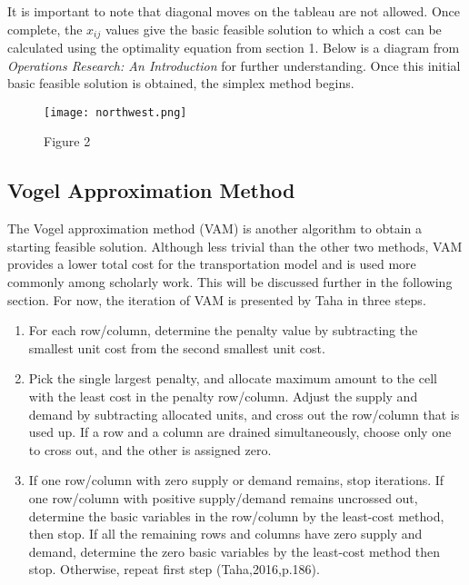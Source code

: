 \documentclass{article}
\begin{document}
It is important to note that diagonal moves on the tableau are not allowed. Once complete, the $x_{ij}$ values give the basic feasible solution to which a cost can be calculated using the optimality equation from section 1. Below is a diagram from \emph{Operations Research: An Introduction} for further understanding. Once this initial basic feasible solution is obtained, the simplex method begins. 

\begin{wrapfigure}
 \begin{center}
    \texttt{[image: northwest.png]}
     \caption{Figure 2}
 \end{center}
\end{wrapfigure}




\subsection{Vogel Approximation Method}

The Vogel approximation method (VAM) is another algorithm to obtain a starting feasible solution. Although less trivial than the other two methods, VAM provides a lower total cost for the transportation model and is used more commonly among scholarly work. This will be discussed further in the following section. For now, the iteration of VAM is presented by Taha in three steps.

\begin{enumerate}
     \item For each row/column, determine the penalty value by subtracting the smallest unit cost from the second smallest unit cost.
     
     \item Pick the single largest penalty, and allocate maximum amount to the cell with the least cost in the penalty row/column. Adjust the supply and demand by subtracting allocated units, and cross out the row/column that is used up. If a row and a column are drained simultaneously, choose only one to cross out, and the other is assigned zero.
     
     \item If one row/column with zero supply or demand remains, stop iterations. If one row/column with positive supply/demand remains uncrossed out, determine the basic variables in the row/column by the least-cost method, then stop. If all the remaining rows and columns have zero supply and demand, determine the zero basic variables by the least-cost method then stop. Otherwise, repeat first step (Taha,2016,p.186). 
     
\end{enumerate}
\end{document}
